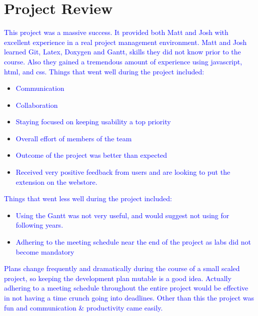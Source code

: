 \documentclass{article}
\begin{document}
	\section{Project Review}
	
	\textcolor{blue}{This project was a massive success. It provided both Matt and Josh 
	with excellent experience in a real project management environment. Matt and Josh 
	learned Git, 
	Latex, Doxygen and Gantt, skills they did not know prior to the course. Also they 
	gained a 
	tremendous amount of experience using javascript, html, and css.}
	\newline
	\textcolor{blue}{Things that went well during the project included:}
		\begin{itemize}
			\item \textcolor{blue}{Communication}
			\item \textcolor{blue}{Collaboration}
			\item \textcolor{blue}{Staying focused on keeping usability a top priority}
			\item \textcolor{blue}{Overall effort of members of the team}
			\item \textcolor{blue}{Outcome of the project was better than expected}
			\item \textcolor{blue}{Received very positive feedback from users and are looking 
			to put the extension on the webstore.}
		\end{itemize}
	\textcolor{blue}{Things that went less well during the project included:}
		\begin{itemize}
			\item \textcolor{blue}{Using the Gantt was not very useful, and would suggest not
			using for following years.}
			\item \textcolor{blue}{Adhering to the meeting schedule near the end of the 
			project as labs did not become mandatory}
		\end{itemize}
	\textcolor{blue}{Plans change frequently and dramatically during the course of a small 
	scaled project, so keeping the development plan mutable is a good idea.}
	\newline
	\newline
	\textcolor{blue}{Actually adhering to a meeting schedule throughout the entire project 
	would be effective in not having a time crunch going into deadlines. Other than this the 
	project was fun and communication \& productivity came easily.}


	
\end{document}
